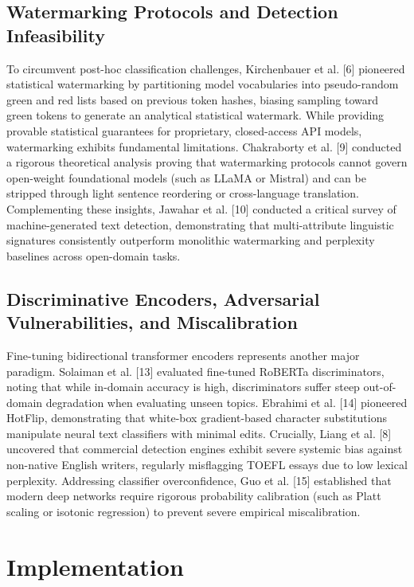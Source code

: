 \documentclass[conference]{IEEEtran}
\begin{document}
\subsection{Watermarking Protocols and Detection Infeasibility}
To circumvent post-hoc classification challenges, Kirchenbauer et al. [6] pioneered statistical watermarking by partitioning model vocabularies into pseudo-random green and red lists based on previous token hashes, biasing sampling toward green tokens to generate an analytical statistical watermark. While providing provable statistical guarantees for proprietary, closed-access API models, watermarking exhibits fundamental limitations. Chakraborty et al. [9] conducted a rigorous theoretical analysis proving that watermarking protocols cannot govern open-weight foundational models (such as LLaMA or Mistral) and can be stripped through light sentence reordering or cross-language translation. Complementing these insights, Jawahar et al. [10] conducted a critical survey of machine-generated text detection, demonstrating that multi-attribute linguistic signatures consistently outperform monolithic watermarking and perplexity baselines across open-domain tasks.

\subsection{Discriminative Encoders, Adversarial Vulnerabilities, and Miscalibration}
Fine-tuning bidirectional transformer encoders represents another major paradigm. Solaiman et al. [13] evaluated fine-tuned RoBERTa discriminators, noting that while in-domain accuracy is high, discriminators suffer steep out-of-domain degradation when evaluating unseen topics. Ebrahimi et al. [14] pioneered HotFlip, demonstrating that white-box gradient-based character substitutions manipulate neural text classifiers with minimal edits. Crucially, Liang et al. [8] uncovered that commercial detection engines exhibit severe systemic bias against non-native English writers, regularly misflagging TOEFL essays due to low lexical perplexity. Addressing classifier overconfidence, Guo et al. [15] established that modern deep networks require rigorous probability calibration (such as Platt scaling or isotonic regression) to prevent severe empirical miscalibration.

\section{Implementation}
\end{document}
